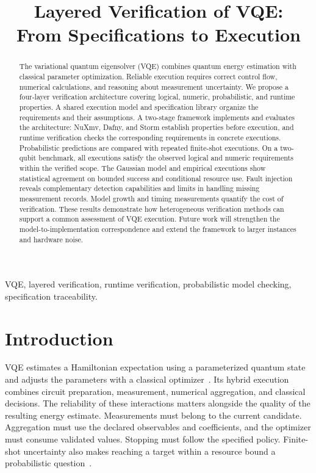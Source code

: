 \documentclass[conference]{IEEEtran}
\author{}
\title{Layered Verification of VQE:\\From Specifications to Execution}
\begin{document}
\raggedbottom
\maketitle
\begin{abstract}
The variational quantum eigensolver (VQE) combines quantum energy estimation with classical parameter optimization. Reliable execution requires correct control flow, numerical calculations, and reasoning about measurement uncertainty. We propose a four-layer verification architecture covering logical, numeric, probabilistic, and runtime properties. A shared execution model and specification library organize the requirements and their assumptions. A two-stage framework implements and evaluates the architecture: NuXmv, Dafny, and Storm establish properties before execution, and runtime verification checks the corresponding requirements in concrete executions. Probabilistic predictions are compared with repeated finite-shot executions. On a two-qubit benchmark, all \BaselineRuns executions satisfy the observed logical and numeric requirements within the verified scope. The Gaussian model and empirical executions show statistical agreement on bounded success and conditional resource use. Fault injection reveals complementary detection capabilities and limits in handling missing measurement records. Model growth and timing measurements quantify the cost of verification. These results demonstrate how heterogeneous verification methods can support a common assessment of VQE execution. Future work will strengthen the model-to-implementation correspondence and extend the framework to larger instances and hardware noise.
\end{abstract}
\begin{IEEEkeywords}
VQE, layered verification, runtime verification, probabilistic model checking, specification traceability.
\end{IEEEkeywords}

\section{Introduction}
\label{sec:introduction}
VQE estimates a Hamiltonian expectation using a parameterized quantum state and adjusts the parameters with a classical optimizer~\cite{peruzzo2014,mcclean2016}. Its hybrid execution combines circuit preparation, measurement, numerical aggregation, and classical decisions. The reliability of these interactions matters alongside the quality of the resulting energy estimate. Measurements must belong to the current candidate. Aggregation must use the declared observables and coefficients, and the optimizer must consume validated values. Stopping must follow the specified policy. Finite-shot uncertainty also makes reaching a target within a resource bound a probabilistic question~\cite{tilly2022}.
\end{document}
